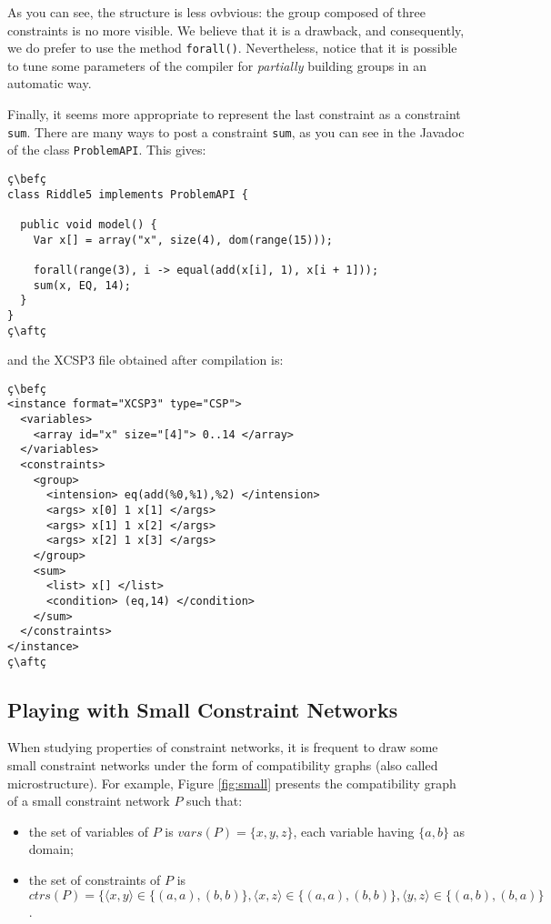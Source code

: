\documentclass[10pt]{article}
\def\xt{{\rm XCSP3}\xspace}
\newcommand{\gb}[1]{{\tt #1}} %
\newcommand{\nn}[1]{{\tt #1}} %
\def\xt{{\rm XCSP3}\xspace}
\def\bef{\rule{10cm}{0.1mm}} %
\def\aft{\rule{10cm}{0.1mm}\medskip}
\begin{document}
As you can see, the structure is less ovbvious: the group composed of three constraints is no more visible.
We believe that it is a drawback, and consequently, we do prefer to use the method \nn{forall()}.
Nevertheless, notice that it is possible to tune some parameters of the compiler for {\em partially} building groups in an automatic way.  

Finally, it seems more appropriate to represent the last constraint as a constraint \gb{sum}. There are many ways to post a constraint \gb{sum}, as you can see in the Javadoc of the class \texttt{ProblemAPI}.
This gives:

\begin{lstlisting}
ç\befç
class Riddle5 implements ProblemAPI {

  public void model() {
    Var x[] = array("x", size(4), dom(range(15)));
    
    forall(range(3), i -> equal(add(x[i], 1), x[i + 1]));
    sum(x, EQ, 14);
  }
}
ç\aftç
\end{lstlisting}
and the \xt file obtained after compilation is:
\begin{lstlisting}
ç\befç
<instance format="XCSP3" type="CSP">
  <variables>
    <array id="x" size="[4]"> 0..14 </array>
  </variables>
  <constraints>
    <group>
      <intension> eq(add(%0,%1),%2) </intension>
      <args> x[0] 1 x[1] </args>
      <args> x[1] 1 x[2] </args>
      <args> x[2] 1 x[3] </args>
    </group>
    <sum>
      <list> x[] </list>
      <condition> (eq,14) </condition>
    </sum>
  </constraints>
</instance>
ç\aftç
\end{lstlisting}



\subsection{Playing with Small Constraint Networks}

When studying properties of constraint networks, it is frequent to draw some small constraint networks under the form of compatibility graphs (also called microstructure).
For example, Figure \ref{fig:small} presents the compatibility graph of a small constraint network $P$ such that:
\begin{itemize}
\item the set of variables of $P$ is $vars(P)=\{x,y,z\}$, each variable having $\{a,b\}$ as domain;
  \item the set of constraints of $P$ is $ctrs(P)= \{\langle x,y \rangle \in \{(a,a),(b,b)\}, \langle x,z \rangle \in \{(a,a),(b,b)\},\langle y,z \rangle \in \{(a,b),(b,a)\}$.
\end{itemize}
\end{document}
